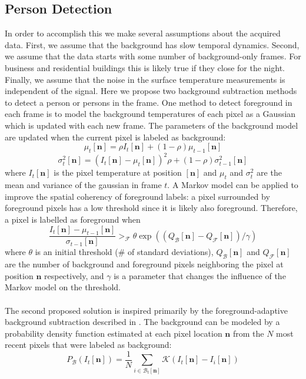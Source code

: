 \documentclass[12pt,oneside]{article} %
\begin{document}
\subsection{Person Detection}
In order to accomplish this
we make several assumptions about the acquired data. First, we assume that the background has slow temporal dynamics.
Second, we assume that the data starts with some number of background-only frames. For business and residential 
buildings this is likely true if they close for the night. Finally, we assume that the noise in the 
surface temperature measurements is independent of the signal.
Here we propose two background subtraction methods to detect a person or persons in the frame. 
One method to detect foreground in each frame is to model the background temperatures of each pixel as a 
Gaussian which is updated with each new frame. The parameters of the background model are updated when 
the current pixel is labeled as background:
$$\mu_t [\mathbf{n}] = \rho I_t [\mathbf{n}] + (1-\rho)\mu_{t-1} [\mathbf{n}]$$
$$\sigma_t^2 [\mathbf{n}] = (I_t [\mathbf{n}] - \mu_t [\mathbf{n}])^2 \rho + (1-\rho)\sigma_{t-1}^2 [\mathbf{n}]$$
where $I_t [\mathbf{n}]$ is the pixel temperature at position $ [\mathbf{n}]$ 
and $\mu_t$ and $\sigma_t^2$ are the mean and variance
of the gaussian in frame $t$. A Markov model can be applied to improve the spatial coherency of foreground labels:
a pixel surrounded by foreground pixels has a low threshold since it is likely also foreground. Therefore,
a pixel is labelled as foreground when
$$\frac{I_t [\mathbf{n}] - \mu_{t-1} [\mathbf{n}]}{\sigma_{t-1} [\mathbf{n}]} >_\mathcal{F} \theta \exp((Q_\mathcal{B} [\mathbf{n}] - Q_\mathcal{F} [\mathbf{n}]) / \gamma)$$
where $\theta$ is an initial threshold (\# of standard deviations), $Q_\mathcal{B}[\mathbf{n}]$ and $Q_\mathcal{F}[\mathbf{n}]$ are the number
of background and foreground pixels neighboring the pixel at position $ \mathbf{n}$ respectively, and $\gamma$ is a parameter that changes 
the influence of the Markov model on the threshold.
\\ \\
The second proposed solution is inspired primarily by the foreground-adaptive background subtraction described in
\cite{Mchugh09}.
The background can be modeled by a probability density function estimated at each pixel location $\mathbf{n}$
from the $N$ most recent pixels that were labeled as background:
$$P_\mathcal{B}\left(I_t [\mathbf{n}]\right) = \frac{1}{N}\sum_{i \in \mathcal{B}_t[\mathbf{n}]} \mathcal{K}
	\left(I_t[\mathbf{n}] - I_i[\mathbf{n}] \right)$$
\end{document}
